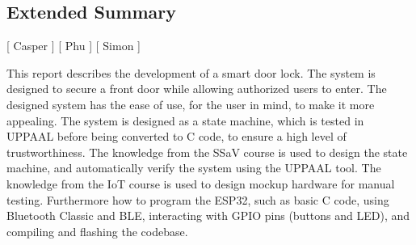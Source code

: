\subsection*{Extended Summary}
[ Casper ] [ Phu ] [ Simon ] 
\newline

This report describes the development of a smart door lock.
The system is designed to secure a front door while allowing authorized users to enter.
The designed system has the ease of use, for the user in mind, to make it more appealing.
The system is designed as a state machine, which is tested in UPPAAL before being converted to C code, to ensure a high level of trustworthiness.
The knowledge from the SSaV course is used to design the state machine, and automatically verify the system using the UPPAAL tool.
The knowledge from the IoT course is used to design mockup hardware for manual testing.
Furthermore how to program the ESP32, such as basic C code, using Bluetooth Classic and BLE, interacting with GPIO pins (buttons and LED), and compiling and flashing the codebase.